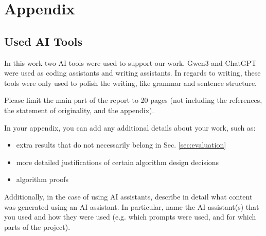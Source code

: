 \documentclass[../report.tex]{subfiles}
\begin{document}
\section*{Appendix}
\label{sec:appendix}

\subsection{Used AI Tools}
In this work two AI tools were used to support our work. Gwen3 and ChatGPT were used as coding assistants and writing assistants. In regards to writing, these tools were only used to polish the writing, like grammar and sentence structure.

Please limit the main part of the report to 20 pages (not including the references, the statement of originality, and the appendix).

In your appendix, you can add any additional details about your work, such as:
\begin{itemize}
	\item extra results that do not necessarily belong in Sec. \ref{sec:evaluation}
	\item more detailed justifications of certain algorithm design decisions
	\item algorithm proofs
\end{itemize}

Additionally, in the case of using AI assistants, describe in detail what content was generated using an AI assistant.
In particular, name the AI assistant(s) that you used and how they were used (e.g. which prompts were used, and for which parts of the project).
\end{document}
